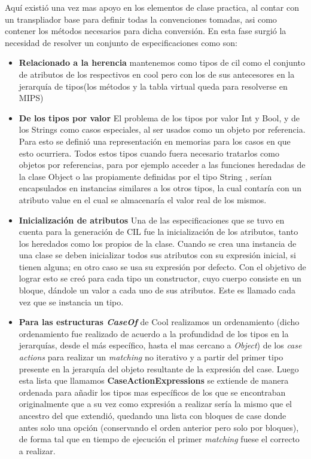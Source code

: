 \documentclass[a4paper,10pt,twocolumn]{article}
\begin{document}
  Aquí existió una vez mas apoyo en los elementos de clase practica, al contar con un transpliador base para definir todas la convenciones tomadas, asi como contener los métodos necesarios para dicha conversión.
 En esta fase surgió la necesidad de resolver  un conjunto de especificaciones como son: 
	\begin{itemize}
		\item \textbf{Relacionado a la herencia} mantenemos como tipos de cil como el conjunto de atributos de los respectivos en cool pero con los de sus antecesores en la jerarqu\'ia de tipos(los m\'etodos y la tabla virtual queda para resolverse en MIPS)
		\item \textbf{De los tipos por valor} El problema de los tipos por valor  Int y	Bool, y de los  Strings como casos especiales, al ser usados como un objeto por referencia. Para esto se definió una representación en memorias para los casos en
		que esto ocurriera. Todos estos tipos cuando fuera necesario tratarlos como objetos
		por referencias, para por ejemplo acceder a las funciones heredadas de la clase
		Object o las propiamente definidas por el tipo String , serían encapsulados en
		instancias similares a los otros tipos, la cual contaría con un atributo value en el cual
		se almacenaría el valor real de los mismos.
		\item \textbf{Inicializaci\'on de atributos} Una de las especificaciones que se tuvo en cuenta para la generación de CIL fue la inicialización
		de los atributos, tanto los heredados como los propios de la clase. Cuando se crea una instancia
		de una clase se deben inicializar todos sus atributos con su expresión inicial, si tienen alguna;
		en otro caso se usa su expresión por defecto. Con el objetivo de lograr esto se creó para cada
		tipo un constructor, cuyo cuerpo consiste en un bloque, dándole un valor a cada uno de sus
		atributos. Este es llamado cada vez que se instancia un tipo.
		\item \textbf{Para las estructuras \textit{CaseOf}} de Cool realizamos un ordenamiento (dicho ordenamiento fue realizado de acuerdo a la profundidad de los tipos en la jerarqu\'ias, desde el m\'as espec\'ifico, hasta el mas cercano a \textit{Object}) de los \textit{case actions} para realizar un \textit{matching} no iterativo y a partir del primer tipo presente en la jerarqu\'ia del objeto resultante de la expresi\'on del case.
		Luego esta lista que llamamos \textbf{CaseActionExpressions} se extiende de manera ordenada para a\~nadir los tipos mas espec\'ificos de los que se encontraban originalmente que a su vez como expresi\'on a realizar ser\'ia la mismo que el ancestro del que extendió, quedando una lista con bloques de case donde antes solo una opci\'on (conservando el orden anterior pero solo por bloques), de forma tal que en tiempo de ejecuci\'on el primer \textit{matching} fuese el correcto a realizar.
	\end{itemize}
\end{document}
